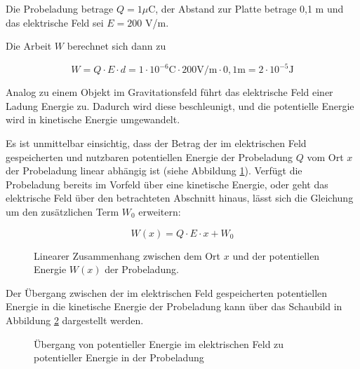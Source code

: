 \begin{frame}
{\begin{bsp}{}{}
	Die Probeladung betrage $Q= 1 \mu \mathrm{C}$, der Abstand zur Platte betrage 0,1 m und das 
	elektrische Feld sei $E= 200$ V/m.

	Die Arbeit $W$ berechnet sich dann zu 

	\begin{equation*}
		W= Q \cdot E \cdot d = 1 \cdot 10^{-6} \mathrm{C} \cdot 200 \mathrm{V/m} \cdot 0,1 \mathrm{m} = 2 \cdot 10^{-5} \mathrm{J} 
	\end{equation*}
\end{bsp}

Analog zu einem Objekt im Gravitationsfeld führt das elektrische Feld einer Ladung Energie zu.
Dadurch wird diese beschleunigt, und die potentielle Energie wird in kinetische Energie
 umgewandelt.


 Es ist unmittelbar einsichtig, dass der Betrag der im elektrischen Feld
gespeicherten und nutzbaren potentiellen Energie der Probeladung
$Q$ vom Ort $x$ der Probeladung linear abhängig ist (siehe Abbildung \ref{fig:zusammenhangEA}). Verfügt die Probeladung
 bereits im Vorfeld über eine kinetische Energie, oder geht das elektrische Feld über den betrachteten Abschnitt hinaus,
 lässt sich die Gleichung um den zusätzlichen Term $W_0$ erweitern:


 \begin{equation}
	W(x) = Q \cdot E \cdot x + W_0
 \end{equation}



 \begin{figure}[ht]
	\centering
	\caption{Linearer Zusammenhang zwischen dem Ort $x$ und der potentiellen Energie $W(x)$ der Probeladung.}
	\label{fig:zusammenhangEA}
\end{figure}


 

Der Übergang zwischen der im elektrischen Feld gespeicherten potentiellen Energie in die kinetische Energie
der Probeladung kann über das Schaubild in Abbildung \ref{fig:ubergang} dargestellt werden.

\begin{figure}[ht]
	\centering
	\caption{Übergang von potentieller Energie im elektrischen Feld zu potentieller Energie in der Probeladung}
	\label{fig:ubergang}
\end{figure}




}
\end{frame}
